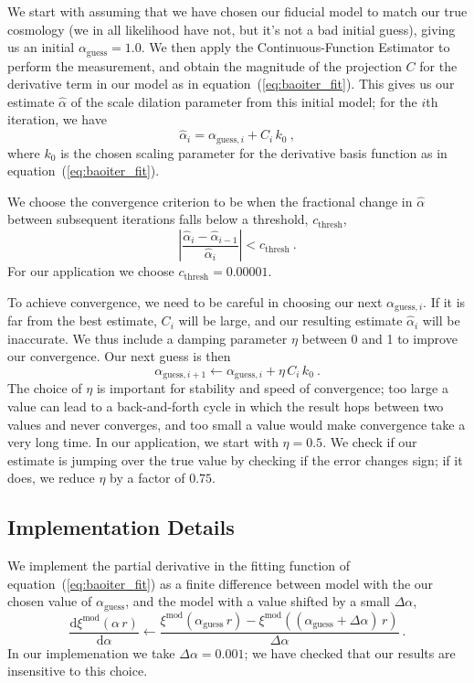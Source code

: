 \documentclass[modern]{aastex62}
\newcommand{\est}{the Continuous-Function Estimator\xspace}
\newcommand{\eqt}[1]{equation~(\ref{#1})}
\newcommand{\dd}{\mathrm{d}}
\begin{document}
We start with assuming that we have chosen our fiducial model to match our true cosmology (we in all likelihood have not, but it's not a bad initial guess), giving us an initial $\alpha_\mathrm{guess} = 1.0$. 
We then apply \est to perform the measurement, and obtain the magnitude of the projection $C$ for the derivative term in our model as in \eqt{eq:baoiter_fit}. 
This gives us our estimate $\hat{\alpha}$ of the scale dilation parameter from this initial model; for the $i$th iteration, we have
\begin{equation}
    \hat{\alpha}_{i} = \alpha_{\mathrm{guess},i} + C_i \, k_0 ~,
\end{equation}
where $k_0$ is the chosen scaling parameter for the derivative basis function as in \eqt{eq:baoiter_fit}.

We choose the convergence criterion to be when the fractional change in $\hat{\alpha}$ between subsequent iterations falls below a threshold, $c_\mathrm{thresh}$,
\begin{equation}
    \left| \frac{\hat{\alpha}_i - \hat{\alpha}_{i-1}}{\hat{\alpha}_i} \right| < c_\mathrm{thresh} ~.
\end{equation}
For our application we choose $c_\mathrm{thresh} = 0.00001$.

To achieve convergence, we need to be careful in choosing our next $\alpha_{\mathrm{guess},i}$.
If it is far from the best estimate, $C_i$ will be large, and our resulting estimate $\hat{\alpha}_{i}$ will be inaccurate.
We thus include a damping parameter $\eta$ between 0 and 1 to improve our convergence.
Our next guess is then
\begin{equation}
    \alpha_{\mathrm{guess},i+1} \leftarrow \alpha_{\mathrm{guess},i} + \eta\,C_i\,k_0 ~.
\end{equation}
The choice of $\eta$ is important for stability and speed of convergence; too large a value can lead to a back-and-forth cycle in which the result hops between two values and never converges, and too small a value would make convergence take a very long time.
In our application, we start with $\eta=0.5$.
We check if our estimate is jumping over the true value by checking if the error changes sign; if it does, we reduce $\eta$ by a factor of $0.75$.

\subsection{Implementation Details}

We implement the partial derivative in the fitting function of \eqt{eq:baoiter_fit} as a finite difference between model with the our chosen value of $\alpha_\mathrm{guess}$, and the model with a value shifted by a small $\Delta \alpha$,
\begin{equation}
    \frac{\dd \xi^\mathrm{mod}(\alpha \, r)}{\dd \alpha} \leftarrow \frac{\xi^\mathrm{mod}(\alpha_\mathrm{guess} \, r) - \xi^\mathrm{mod}((\alpha_\mathrm{guess} + \Delta \alpha) \, r)}{\Delta \alpha} ~.
\end{equation}
In our implemenation we take $\Delta \alpha = 0.001$; we have checked that our results are insensitive to this choice.
\end{document}
